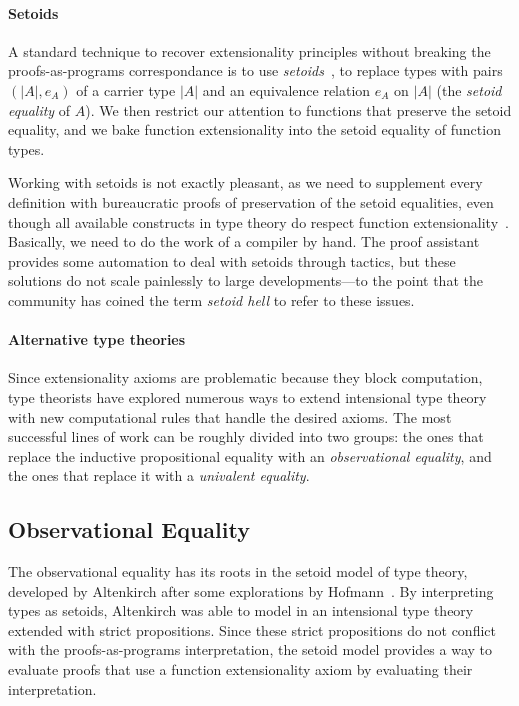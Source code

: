 \paragraph*{Setoids}
% 
A standard technique to recover extensionality principles without breaking the
proofs-as-programs correspondance is to use \emph{setoids}~,
\ie to replace types with pairs \( (|A|, e_A) \) of a carrier type \( |A| \)
and an equivalence relation \( e_A \) on \( |A| \) 
(the \emph{setoid equality} of \( A \)).
% 
We then restrict our attention to functions that preserve the setoid equality, 
and we bake function extensionality into the setoid equality of function types.

Working with setoids is not exactly pleasant, as we need to supplement every
definition with bureaucratic proofs of preservation of the setoid equalities,
even though all available constructs in type theory do respect function 
extensionality~.
% 
Basically, we need to do the work of a compiler by hand.
% 
The \Coq proof assistant provides some automation to deal with setoids through 
tactics, but these solutions do not scale painlessly to large developments---to 
the point that the community has coined the term \emph{setoid hell} to refer 
to these issues.

\paragraph*{Alternative type theories}
% 
Since extensionality axioms are problematic because they block 
computation, type theorists have explored numerous ways to extend intensional
type theory with new computational rules that handle the desired axioms.
% 
The most successful lines of work can be roughly divided into two groups: the 
ones that replace the inductive propositional equality with an \emph{observational equality}, 
and the ones that replace it with a \emph{univalent equality}.
% 

\subsection{Observational Equality}

The observational equality has its roots in the setoid model of type theory, 
developed by Altenkirch after some explorations by Hofmann~\cite{hofmann95,altenkirch99}.
% 
By interpreting types as setoids, Altenkirch was able to model
in an intensional type theory extended with strict propositions.
% 
Since these strict propositions do not conflict with the proofs-as-programs 
interpretation, the setoid model provides a way to evaluate proofs that use a 
function extensionality axiom by evaluating their interpretation.

